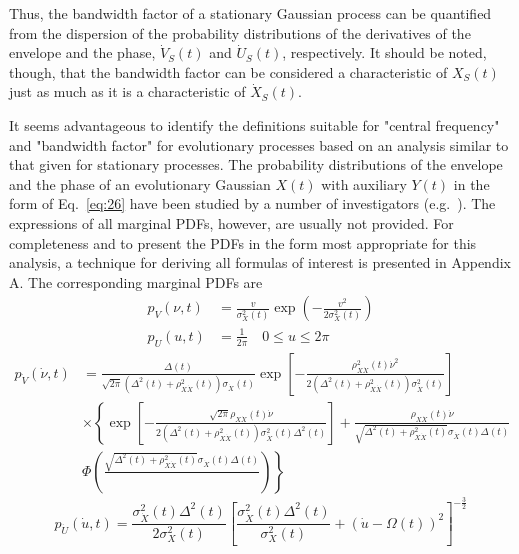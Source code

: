 \documentclass[12pt]{article}
\begin{document}
Thus, the bandwidth factor of a stationary Gaussian process can be quantified from the dispersion of the probability distributions of the derivatives of the envelope and the phase, $\dot{V}_{S}(t)$ and $\dot{U}_{S}(t)$, respectively. It should be noted, though, that the bandwidth factor can be considered a characteristic of $X_{S}(t)$ just as much as it is a characteristic of $\dot{X}_{S}(t)$.

It seems advantageous to identify the definitions suitable for "central frequency" and "bandwidth factor" for evolutionary processes based on an analysis similar to that given for stationary processes. The probability distributions of the envelope and the phase of an evolutionary Gaussian $X(t)$ with auxiliary $Y(t)$ in the form of Eq.~\eqref{eq:26} have been studied by a number of investigators (e.g.~\cite{Muscolino1988,Yang1972}). The expressions of all marginal PDFs, however, are usually not provided. For completeness and to present the PDFs in the form most appropriate for this analysis, a technique for deriving all formulas of interest is presented in Appendix A. The corresponding marginal PDFs are
\begin{align}
p_{V}(\nu, t) &=\frac{v}{\sigma_{X}^{2}(t)} \exp \left(-\frac{v^{2}}{2 \sigma_{X}^{2}(t)}\right) \label{eq:59} \\
p_{U}(u, t) &=\frac{1}{2 \pi} \quad 0 \leqslant u \leqslant 2 \pi \label{eq:60}
\end{align}
\begin{align}
p_{\dot{V}}(\dot{\nu}, t) &=\frac{\Delta(t)}{\sqrt{2 \pi}\left(\Delta^{2}(t)+\rho_{X \dot{X}}^{2}(t)\right) \sigma_{\dot{X}}(t)} \exp \left[-\frac{\rho_{X \dot{X}}^{2}(t) \dot{\nu}^{2}}{2\left(\Delta^{2}(t)+\rho_{X \dot{X}}^{2}(t)\right) \sigma_{\dot{X}}^{2}(t)}\right] \nonumber \\
&\times\left\{\exp \left[-\frac{\sqrt{2 \pi} \rho_{X \dot{X}}(t) \dot{\nu}}{2\left(\Delta^{2}(t)+\rho_{X \dot{X}}^{2}(t)\right) \sigma_{\dot{X}}^{2}(t) \Delta^{2}(t)}\right]+\frac{\rho_{X \dot{X}}(t) \dot{\nu}}{\sqrt{\Delta^{2}(t)+\rho_{X \dot{X}}^{2}(t)} \sigma_{\dot{X}}(t) \Delta(t)} \right. \nonumber \\
&\left.\Phi\left(\frac{\sqrt{\Delta^{2}(t)+\rho_{X \dot{X}}^{2}(t)} \sigma_{\dot{X}}(t) \Delta(t)}{}\right)\right\} \label{eq:61}
\end{align}
\begin{equation}
p_{\dot{U}}(\dot{u}, t)=\frac{\sigma_{\dot{X}}^{2}(t) \Delta^{2}(t)}{2 \sigma_{X}^{2}(t)}\left[\frac{\sigma_{\dot{X}}^{2}(t) \Delta^{2}(t)}{\sigma_{X}^{2}(t)}+(\dot{u}-\Omega(t))^{2}\right]^{-\frac{3}{2}}
\label{eq:62}
\end{equation}
\end{document}
